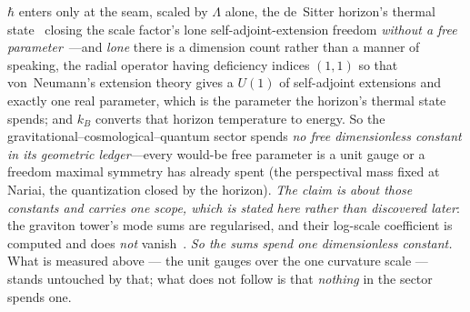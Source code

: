 \documentclass[11pt,a4paper]{article}
\theoremstyle{definition}
\begin{document}
\begin{enumerate}
$\hbar$ enters only at the seam, scaled by $\Lambda$ alone, the de~Sitter
horizon's thermal state~\cite{GibbonsHawking1977} closing the scale factor's lone self-adjoint-extension
freedom \emph{without a free parameter}~\cite{JanzenCanonicalTime}---and \emph{lone} there is a dimension count rather than a manner of speaking, the radial operator having deficiency indices $(1,1)$ so that von~Neumann's extension theory gives a $U(1)$ of self-adjoint extensions and exactly one real parameter, which is the parameter the horizon's thermal state spends; and $k_B$
converts that horizon temperature to energy. So the
gravitational--cosmological--quantum sector spends \emph{no free dimensionless
constant in its geometric ledger}---every would-be free parameter is a unit gauge or a freedom maximal
symmetry has already spent (the perspectival mass fixed at Nariai, the
quantization closed by the horizon).  \emph{The claim is about those constants and
carries one scope, which is stated here rather than discovered later}: the graviton
tower's mode sums are regularised, and their log-scale coefficient is computed and
does \emph{not} vanish~\cite{JanzenCanonicalTime}. \emph{So the sums spend one
dimensionless constant.}  What is measured above --- the unit gauges over the one
curvature scale --- stands untouched by that; what does not follow is that
\emph{nothing} in the sector spends one. 


\end{enumerate}
\end{document}
